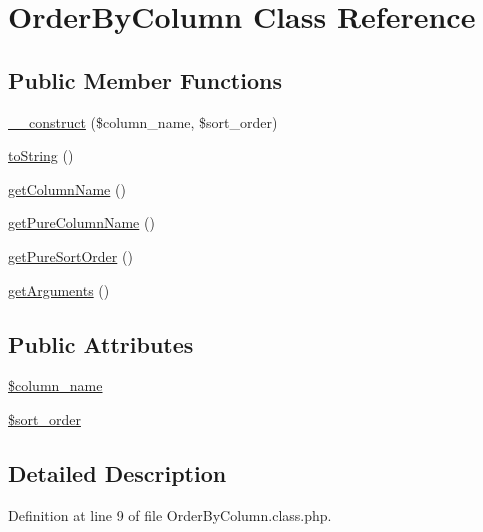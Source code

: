 \hypertarget{classOrderByColumn}{\section{Order\-By\-Column Class Reference}
\label{classOrderByColumn}
}
\subsection*{Public Member Functions}
\begin{DoxyCompactItemize}
\item 
\hyperlink{classOrderByColumn_a5e92d8b7f0b5fe2a832ed43894c4e810}{\-\_\-\-\_\-construct} (\$column\-\_\-name, \$sort\-\_\-order)
\item 
\hyperlink{classOrderByColumn_a6db0b86d7ed8ac3a9467ad9c2b70a022}{to\-String} ()
\item 
\hyperlink{classOrderByColumn_aa6e094dc084a79fa96a6cc529ac4431f}{get\-Column\-Name} ()
\item 
\hyperlink{classOrderByColumn_a11d8fa0bb15e4089d6cedde469f51aa7}{get\-Pure\-Column\-Name} ()
\item 
\hyperlink{classOrderByColumn_a7279ca2da1f1376de633eef931ff86ff}{get\-Pure\-Sort\-Order} ()
\item 
\hyperlink{classOrderByColumn_affbf2de8abb67fedf4fac695a2824392}{get\-Arguments} ()
\end{DoxyCompactItemize}
\subsection*{Public Attributes}
\begin{DoxyCompactItemize}
\item 
\hyperlink{classOrderByColumn_a4c1243e9acca95ecc01d0a37856be6e1}{\$column\-\_\-name}
\item 
\hyperlink{classOrderByColumn_ad62eb7e1435d62f643135df8094efba5}{\$sort\-\_\-order}
\end{DoxyCompactItemize}


\subsection{Detailed Description}


Definition at line 9 of file Order\-By\-Column.\-class.\-php.



